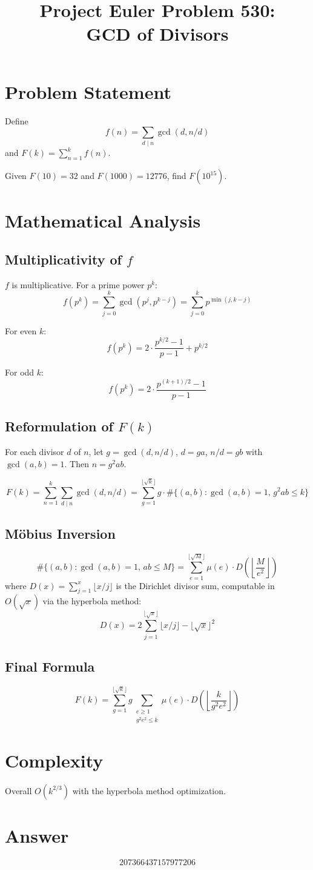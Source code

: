 \documentclass[12pt]{article}
\title{Project Euler Problem 530:\\GCD of Divisors}
\author{}
\date{}
\begin{document}
\maketitle

\section{Problem Statement}
Define
\[
f(n) = \sum_{d \mid n} \gcd(d, n/d)
\]
and $F(k) = \sum_{n=1}^{k} f(n)$.

Given $F(10) = 32$ and $F(1000) = 12776$, find $F(10^{15})$.

\section{Mathematical Analysis}

\subsection{Multiplicativity of $f$}
$f$ is multiplicative. For a prime power $p^k$:
\[
f(p^k) = \sum_{j=0}^{k} \gcd(p^j, p^{k-j}) = \sum_{j=0}^{k} p^{\min(j,k-j)}
\]

For even $k$:
\[
f(p^k) = 2 \cdot \frac{p^{k/2}-1}{p-1} + p^{k/2}
\]

For odd $k$:
\[
f(p^k) = 2 \cdot \frac{p^{(k+1)/2}-1}{p-1}
\]

\subsection{Reformulation of $F(k)$}
For each divisor $d$ of $n$, let $g = \gcd(d, n/d)$, $d = ga$, $n/d = gb$ with $\gcd(a,b)=1$. Then $n = g^2 ab$.

\[
F(k) = \sum_{n=1}^{k} \sum_{d \mid n} \gcd(d, n/d) = \sum_{g=1}^{\lfloor\sqrt{k}\rfloor} g \cdot \#\{(a,b) : \gcd(a,b)=1,\, g^2 ab \le k\}
\]

\subsection{M\"obius Inversion}
\[
\#\{(a,b) : \gcd(a,b)=1,\, ab \le M\} = \sum_{e=1}^{\lfloor\sqrt{M}\rfloor} \mu(e) \cdot D\!\left(\left\lfloor \frac{M}{e^2} \right\rfloor\right)
\]
where $D(x) = \sum_{j=1}^{x} \lfloor x/j \rfloor$ is the Dirichlet divisor sum, computable in $O(\sqrt{x})$ via the hyperbola method:
\[
D(x) = 2 \sum_{j=1}^{\lfloor\sqrt{x}\rfloor} \lfloor x/j \rfloor - \lfloor\sqrt{x}\rfloor^2
\]

\subsection{Final Formula}
\[
F(k) = \sum_{g=1}^{\lfloor\sqrt{k}\rfloor} g \sum_{\substack{e \ge 1 \\ g^2 e^2 \le k}} \mu(e) \cdot D\!\left(\left\lfloor \frac{k}{g^2 e^2}\right\rfloor\right)
\]

\section{Complexity}
Overall $O(k^{2/3})$ with the hyperbola method optimization.

\section{Answer}

\[
\boxed{207366437157977206}
\]
\end{document}
